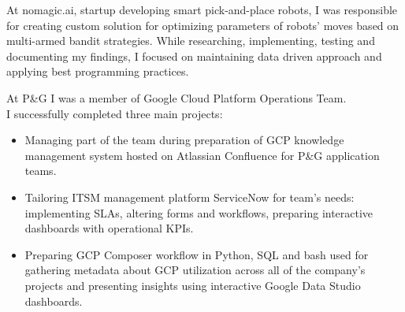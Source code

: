 \documentclass[10pt,a4paper]{altacv}
\begin{document}

\begin{fullwidth}
\makecvheader
\end{fullwidth}



At nomagic.ai, startup developing smart pick-and-place robots, I was responsible for creating custom solution for optimizing parameters of robots' moves based on multi-armed bandit strategies. While researching, implementing, testing and documenting my findings, I focused on maintaining data driven approach and applying best programming practices. 

\divider


At P\&G I was a member of Google Cloud Platform Operations Team. \\ I successfully completed three main projects:
\begin{itemize}

\item Managing part of the team during preparation of GCP knowledge management system hosted on Atlassian Confluence for P\&G application teams.
\item Tailoring ITSM management platform ServiceNow for team's needs: implementing SLAs, altering forms and workflows, preparing interactive dashboards with operational KPIs.
\item Preparing GCP Composer workflow in Python, SQL and bash used for gathering metadata about GCP utilization across all of the company's projects and presenting insights using interactive Google Data Studio dashboards.
\end{itemize}
\end{document}
